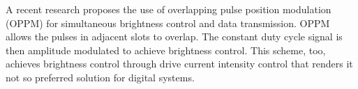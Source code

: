 A recent research \cite{bai2010joint} proposes the use of overlapping pulse position modulation (OPPM) for simultaneous brightness control and data transmission.  OPPM allows the pulses in adjacent slots to overlap. The constant duty cycle signal is then amplitude modulated to achieve brightness control. This scheme, too, achieves brightness control through drive current intensity control that renders it not so preferred solution for digital systems.


